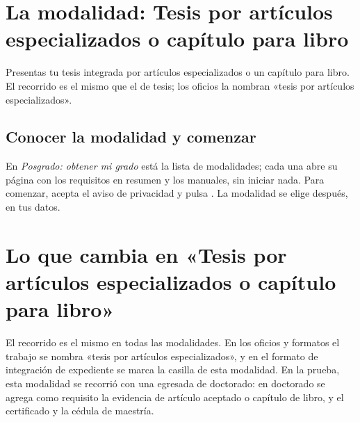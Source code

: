 \section{La modalidad: Tesis por artículos especializados o capítulo para libro}
Presentas tu tesis integrada por artículos especializados o un capítulo para libro. El recorrido es el mismo que el de tesis; los oficios la nombran «tesis por artículos especializados».

\subsection{Conocer la modalidad y comenzar}
En \emph{Posgrado: obtener mi grado} está la lista de modalidades; cada una abre su página con los requisitos en resumen y los manuales, sin iniciar nada. Para comenzar, acepta el aviso de privacidad y pulsa . La modalidad se elige después, en tus datos.
\section{Lo que cambia en «Tesis por artículos especializados o capítulo para libro»}
El recorrido es el mismo en todas las modalidades. En los oficios y formatos el trabajo se nombra «tesis por artículos especializados», y en el formato de integración de expediente se marca la casilla de esta modalidad.
En la prueba, esta modalidad se recorrió con una egresada de doctorado: en doctorado se agrega como requisito la evidencia de artículo aceptado o capítulo de libro, y el certificado y la cédula de maestría.
